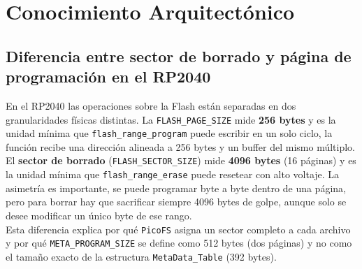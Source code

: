 \documentclass[12pt,letterpaper]{article}
\begin{document}
\newpage


\section*{Conocimiento Arquitectónico}

\subsection*{Diferencia entre sector de borrado y página de programación en el RP2040}
En el RP2040 las operaciones sobre la Flash están separadas en dos granularidades físicas distintas.
La \texttt{FLASH\_PAGE\_SIZE} mide \textbf{256 bytes} y es la unidad mínima que \texttt{flash\_range\_program}
puede escribir en un solo ciclo, la función recibe una dirección alineada a 256 bytes y un buffer del mismo
múltiplo.\\
El \textbf{sector de borrado} (\texttt{FLASH\_SECTOR\_SIZE}) mide \textbf{4096 bytes} (16 páginas) y es la unidad
mínima que \texttt{flash\_range\_erase} puede resetear con alto voltaje. La asimetría es importante, se puede
programar byte a byte dentro de una página, pero para borrar hay que sacrificar siempre 4096 bytes de golpe,
aunque solo se desee modificar un único byte de ese rango.\\
Esta diferencia explica por qué \texttt{PicoFS} asigna un sector completo a cada archivo y por qué
\texttt{META\_PROGRAM\_SIZE} se define como 512 bytes (dos páginas) y no como el tamaño exacto de la estructura
\texttt{MetaData\_Table} (392 bytes).

\end{document}
